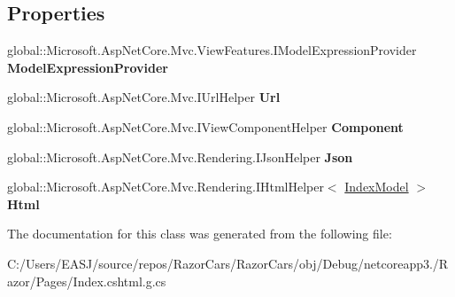 \subsection*{Properties}
\begin{DoxyCompactItemize}
\item 
\mbox{\label{class_razor_cars_1_1_pages_1_1_pages___index_a4fafc4832f5eeb9d0e4c4017d8dd0ce2}} 
global\+::\+Microsoft.\+Asp\+Net\+Core.\+Mvc.\+View\+Features.\+I\+Model\+Expression\+Provider {\bfseries Model\+Expression\+Provider}
\item 
\mbox{\label{class_razor_cars_1_1_pages_1_1_pages___index_a98cf2a5acecbbf8be4085f9f44444423}} 
global\+::\+Microsoft.\+Asp\+Net\+Core.\+Mvc.\+I\+Url\+Helper {\bfseries Url}
\item 
\mbox{\label{class_razor_cars_1_1_pages_1_1_pages___index_ad208746ca2ae563af24bf98d61d0c866}} 
global\+::\+Microsoft.\+Asp\+Net\+Core.\+Mvc.\+I\+View\+Component\+Helper {\bfseries Component}
\item 
\mbox{\label{class_razor_cars_1_1_pages_1_1_pages___index_a57ed89b1684275782edf01975b5ee936}} 
global\+::\+Microsoft.\+Asp\+Net\+Core.\+Mvc.\+Rendering.\+I\+Json\+Helper {\bfseries Json}
\item 
\mbox{\label{class_razor_cars_1_1_pages_1_1_pages___index_a8d846738f5c4274fde26d91100878481}} 
global\+::\+Microsoft.\+Asp\+Net\+Core.\+Mvc.\+Rendering.\+I\+Html\+Helper$<$ \mbox{\hyperlink{class_razor_cars_1_1_pages_1_1_index_model}{Index\+Model}} $>$ {\bfseries Html}
\end{DoxyCompactItemize}


The documentation for this class was generated from the following file\+:\begin{DoxyCompactItemize}
\item 
C\+:/\+Users/\+E\+A\+S\+J/source/repos/\+Razor\+Cars/\+Razor\+Cars/obj/\+Debug/netcoreapp3./\+Razor/\+Pages/Index.\+cshtml.\+g.\+cs\end{DoxyCompactItemize}

